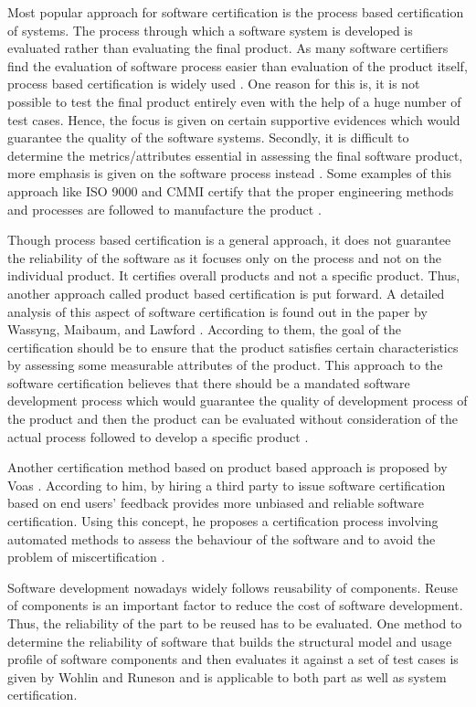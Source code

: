 \documentclass[11pt,letterpaper]{report}
\begin{document}
Most popular approach for software certification is the process based certification of systems. The process through which a software system is developed is evaluated rather than evaluating the final product. As many software certifiers find the evaluation of software process easier than evaluation of the product itself, process based certification is widely used \cite{Lawford}. One reason for this is, it is not possible to test the final product entirely even with the help of a huge number of test cases. Hence, the focus is given on certain supportive evidences which would guarantee the quality of the software systems. Secondly, it is difficult to determine the metrics/attributes essential in assessing the final software product, more emphasis is given on the software process instead \cite{Lawford}. Some examples of this approach like ISO 9000 and CMMI certify that the proper engineering methods and processes are followed to manufacture the product \cite{Voas}.

Though process based certification is a general approach, it does not guarantee the reliability of the software as it focuses only on the process and not on the individual product. It certifies overall products and not a specific product. Thus, another approach called product based certification is put forward. A detailed analysis of this aspect of software certification is found out in the paper by Wassyng, Maibaum, and Lawford \cite{Lawford}. According to them, the goal of the certification should be to ensure that the product satisfies certain characteristics by assessing some measurable attributes of the product. This approach to the software certification believes that there should be a mandated software development process which would guarantee the quality of development process of the product and then the product can be evaluated without consideration of the actual process followed to develop a specific product \cite{Lawford}.

Another certification method based on product based approach is proposed by Voas \cite{Voas}. According to him, by hiring a third party to issue software certification based on end users' feedback provides more unbiased and reliable software certification. Using this concept, he proposes a certification process involving automated methods to assess the behaviour of the software and to avoid the problem of miscertification \cite{Voas}.

Software development nowadays widely follows reusability of components. Reuse of components is an important factor to reduce the cost of software development. Thus, the reliability of the part to be reused has to be evaluated. One method to determine the reliability of software that builds the structural model and usage profile of software components and then evaluates it against a set of test cases is given by Wohlin and Runeson \cite{CSC} and is applicable to both part as well as system certification.
\end{document}
